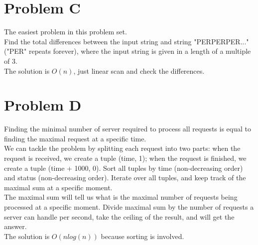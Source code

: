 \documentclass[10pt]{article}
\begin{document}


\newpage



\section*{Problem C}

The easiest problem in this problem set.\\

Find the total differences between the input string and string "PERPERPER..." ("PER" repeats forever), where the input string is given in a length of a multiple of 3.\\

The solution is $O(n)$, just linear scan and check the differences.\\



\newpage



\section*{Problem D}

Finding the minimal number of server required to process all requests is equal to finding the maximal request at a specific time. \\

We can tackle the problem by splitting each request into two parts: when the request is received, we create a tuple (time, 1); when the request is finished, we create a tuple (time + 1000, 0). Sort all tuples by time (non-decreasing order) and status (non-decreasing order). Iterate over all tuples, and keep track of the maximal sum at a specific moment. \\

The maximal sum will tell us what is the maximal number of requests being processed at a specific moment. Divide maximal sum by the number of requests a server can handle per second, take the ceiling of the result, and will get the answer.\\

The solution is $O(nlog(n))$ because sorting is involved.



\newpage
\end{document}
